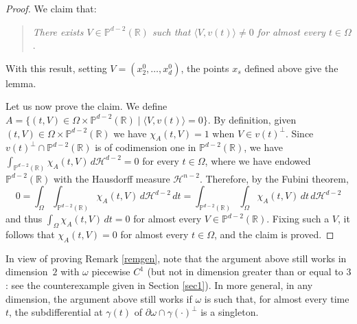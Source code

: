 \documentclass[JEP,XML,SOM,Unicode, NoEqCountersInSection,NoFloatCountersInSection,published]{cedram}
\def\R{\mathbb{R}}
\theoremstyle{definition}
\begin{document}
\begin{proof}
We claim that:
\begin{quote}
\textit{There exists $V\in \mathbb{P}^{d-2}(\R)$ such that $\langle V,v(t)\rangle\neq 0$ for almost every $t\in\Omega$}.
\end{quote}
With this result, setting $V=(x_2^0,\ldots,x_d^0)$, the points $x_s$ defined above give the lemma.

Let us now prove the claim.
We define $A=\{ (t,V)\in\Omega\times\mathbb{P}^{d-2}(\R)\mid \langle V,v(t)\rangle=0\}$. By definition, given $(t,V)\in\Omega\times\mathbb{P}^{d-2}(\R)$ we have $\chi_A(t,V)=1$ when $V\in v(t)^\perp$. Since $v(t)^\perp\cap\mathbb{P}^{d-2}(\R)$ is of codimension one in $\mathbb{P}^{d-2}(\R)$, we have $\int_{\mathbb{P}^{d-2}(\R)} \chi_A(t,V)\, d\mathcal{H}^{d-2}=0$ for every $t\in\Omega$, where we have endowed $\mathbb{P}^{d-2}(\R)$ with the Hausdorff measure $\mathcal{H}^{n-2}$. Therefore, by the Fubini theorem,
\[
0 = \int_\Omega \int_{\mathbb{P}^{d-2}(\R)} \chi_A(t,V)\, d\mathcal{H}^{d-2}\, dt = \int_{\mathbb{P}^{d-2}(\R)} \int_\Omega \chi_A(t,V)\, dt\, d\mathcal{H}^{d-2}
\]
and thus $\int_\Omega \chi_A(t,V)\, dt=0$ for almost every $V\in\mathbb{P}^{d-2}(\R)$. Fixing such a $V$, it follows that $\chi_A(t,V)=0$ for almost every $t\in\Omega$, and the claim is proved.
\end{proof}

In view of proving Remark \ref{remgen}, note that the argument above still works in dimension~$2$ with $\omega$ piecewise $C^1$ (but not in dimension greater than or equal to $3$: see the counterexample given in Section \ref{sec1}).
In more general, in any dimension, the argument above still works if $\omega$ is such that, for almost every time $t$, the subdifferential at $\gamma(t)$ of $\partial\omega\cap\gamma(\cdot)^\perp$ is a singleton.
\end{document}
